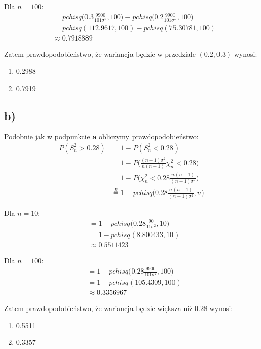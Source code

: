 \documentclass{article}
\begin{document}
Dla $n=100$:
\begin{align*}
& = pchisq\Big( 0.3\frac{9900}{101\sigma^2},100 \Big) - pchisq\Big( 0.2\frac{9900}{101\sigma^2},100 \Big) \\
& = pchisq(112.9617,100) - pchisq(75.30781,100) \\
& \approx 0.7918889
\end{align*}

Zatem prawdopodobieństwo, że  wariancja będzie w przedziale $(0.2,0.3)$ wynosi:
\begin{enumerate}[label = \roman*)]
\item 0.2988
\item 0.7919
\end{enumerate}

\subsection*{b)}
Podobnie jak w podpunkcie \textbf{a} obliczymy prawdopodobieństwo:
\begin{align*}
P(S_n^2 > 0.28) & = 1 - P(S_n^2 < 0.28) \\
& = 1 - P\Big(  \frac{(n+1)\sigma^2}{n(n-1)} \chi_n^2 < 0.28 \Big) \\
& = 1 - P\Big( \chi_n^2 < 0.28 \frac{n(n-1)}{(n+1)\sigma^2} \Big) \\
& \overset{R}{=} 1 - pchisq\Big(  0.28 \frac{n(n-1)}{(n+1)\sigma^2}, n \Big)
\end{align*}

Dla $n=10$:
\begin{align*}
& =  1 - pchisq\Big(  0.28 \frac{90}{11\sigma^2}, 10 \Big) \\
& =  1 - pchisq( 8.800433, 10 ) \\
& \approx 0.5511423
\end{align*}

Dla $n=100$:
\begin{align*}
& =  1 - pchisq\Big(  0.28 \frac{9900}{101\sigma^2}, 100 \Big) \\
& =  1 - pchisq( 105.4309, 100 ) \\
& \approx 0.3356967
\end{align*}

Zatem prawdopodobieństwo, że wariancja będzie większa niż 0.28 wynosi:
\begin{enumerate}[label = \roman*)]
\item 0.5511
\item 0.3357
\end{enumerate}
\end{document}
